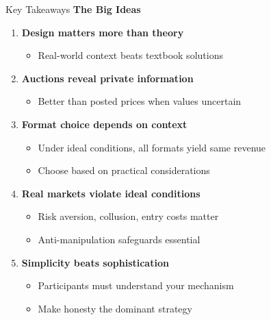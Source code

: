 \documentclass[xcolor={x11names}]{beamer}
\begin{document}
\begin{frame}{Key Takeaways}
\textbf{The Big Ideas}

\begin{enumerate}
  \item \textbf{Design matters more than theory}
  \begin{itemize}
    \item Real-world context beats textbook solutions
  \end{itemize}
  
  \item \textbf{Auctions reveal private information}
  \begin{itemize}
    \item Better than posted prices when values uncertain
  \end{itemize}
  
  \item \textbf{Format choice depends on context}
  \begin{itemize}
    \item Under ideal conditions, all formats yield same revenue
    \item Choose based on practical considerations
  \end{itemize}
  
  \item \textbf{Real markets violate ideal conditions}
  \begin{itemize}
    \item Risk aversion, collusion, entry costs matter
    \item Anti-manipulation safeguards essential
  \end{itemize}
  
  \item \textbf{Simplicity beats sophistication}
  \begin{itemize}
    \item Participants must understand your mechanism
    \item Make honesty the dominant strategy
  \end{itemize}
\end{enumerate}
\end{frame}
\end{document}
